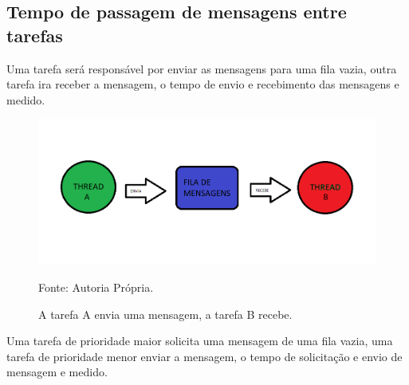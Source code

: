 		

\subsection{Tempo de passagem de mensagens entre tarefas}
Uma tarefa será responsável por enviar as mensagens para uma fila vazia, outra
tarefa ira receber a mensagem, o tempo de envio e recebimento das mensagens e
medido.

\begin{figure}[H]
	\centering
	\includegraphics[width=15cm]{imagens/fila_mensagens.png}
	\caption{A tarefa A envia uma mensagem, a tarefa B recebe.}
	Fonte: Autoria Própria.
	\label{fig: fila_mensagens}
\end{figure}

Uma tarefa de prioridade maior solicita uma mensagem de uma fila vazia, uma tarefa
de prioridade menor enviar a mensagem, o tempo de solicitação e envio de mensagem e
medido.

